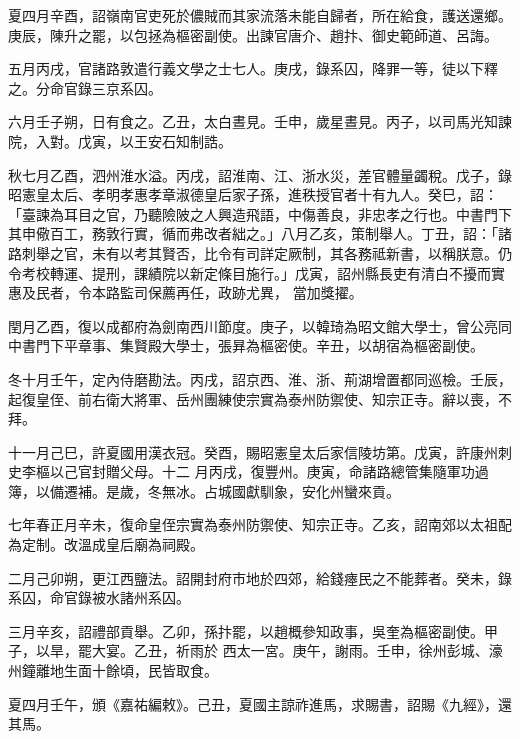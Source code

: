 \begin{pinyinscope}
 夏四月辛酉，詔嶺南官吏死於儂賊而其家流落未能自歸者，所在給食，護送還鄉。庚辰，陳升之罷，以包拯為樞密副使。出諫官唐介、趙抃、御史範師道、呂誨。



 五月丙戌，官諸路敦遣行義文學之士七人。庚戌，錄系囚，降罪一等，徒以下釋之。分命官錄三京系囚。



 六月壬子朔，日有食之。乙丑，太白晝見。壬申，歲星晝見。丙子，以司馬光知諫院，入對。戊寅，以王安石知制誥。



 秋七月乙酉，泗州淮水溢。丙戌，詔淮南、江、浙水災，差官體量蠲稅。戊子，錄
 昭憲皇太后、孝明孝惠孝章淑德皇后家子孫，進秩授官者十有九人。癸巳，詔：「臺諫為耳目之官，乃聽險陂之人興造飛語，中傷善良，非忠孝之行也。中書門下其申儆百工，務敦行實，循而弗改者絀之。」八月乙亥，策制舉人。丁丑，詔：「諸路刺舉之官，未有以考其賢否，比令有司詳定厥制，其各務祗新書，以稱朕意。仍令考校轉運、提刑，課績院以新定條目施行。」戊寅，詔州縣長吏有清白不擾而實惠及民者，令本路監司保薦再任，政跡尤異，
 當加獎擢。



 閏月乙酉，復以成都府為劍南西川節度。庚子，以韓琦為昭文館大學士，曾公亮同中書門下平章事、集賢殿大學士，張昪為樞密使。辛丑，以胡宿為樞密副使。



 冬十月壬午，定內侍磨勘法。丙戌，詔京西、淮、浙、荊湖增置都同巡檢。壬辰，起復皇侄、前右衛大將軍、岳州團練使宗實為泰州防禦使、知宗正寺。辭以喪，不拜。



 十一月己巳，許夏國用漢衣冠。癸酉，賜昭憲皇太后家信陵坊第。戊寅，許康州刺史李樞以己官封贈父母。十二
 月丙戌，復豐州。庚寅，命諸路總管集隨軍功過簿，以備遷補。是歲，冬無冰。占城國獻馴象，安化州蠻來貢。



 七年春正月辛未，復命皇侄宗實為泰州防禦使、知宗正寺。乙亥，詔南郊以太祖配為定制。改溫成皇后廟為祠殿。



 二月己卯朔，更江西鹽法。詔開封府市地於四郊，給錢瘞民之不能葬者。癸未，錄系囚，命官錄被水諸州系囚。



 三月辛亥，詔禮部貢舉。乙卯，孫抃罷，以趙概參知政事，吳奎為樞密副使。甲子，以旱，罷大宴。乙丑，祈雨於
 西太一宮。庚午，謝雨。壬申，徐州彭城、濠州鐘離地生面十餘頃，民皆取食。



 夏四月壬午，頒《嘉祐編敕》。己丑，夏國主諒祚進馬，求賜書，詔賜《九經》，還其馬。




\end{pinyinscope}
